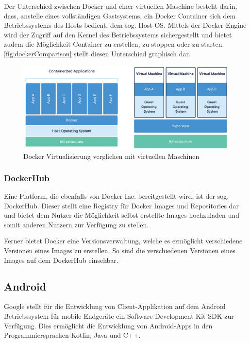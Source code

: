 			Der Unterschied zwischen Docker und einer virtuellen Maschine besteht darin, dass, anstelle eines vollständigen Gastsystems, ein Docker Container sich dem Betriebssystems des Hosts bedient, dem sog. Host OS. Mittels der Docker Engine wird der Zugriff auf den Kernel des Betriebssystems sichergestellt und bietet zudem die Möglichkeit Container zu erstellen, zu stoppen oder zu starten. \autoref{fig:dockerComparison} stellt diesen Unterschied graphisch dar. \cite{Turnbull.2014}
			
			\begin{figure}[ht!]
				\centering
				\includegraphics[width=1\textwidth]{images/docker-containerized-and-vm-transparent-bg.png}
				\caption{Docker Virtualisierung verglichen mit virtuellen Maschinen \cite{DockerInc..2020}}
				\label{fig:dockerComparison}
			\end{figure} 
			
			\subsubsection{DockerHub} %
				
				Eine Platform, die ebenfalls von Docker Inc. bereitgestellt wird, ist der sog. DockerHub. Dieser stellt eine Registry für Docker Images und Repositories dar und bietet dem Nutzer die Möglichkeit selbst erstellte Images hochzuladen und somit anderen Nutzern zur Verfügung zu stellen. 
				
				Ferner bietet Docker eine Versionsverwaltung, welche es ermöglicht verschiedene Versionen eines Images zu erstellen. So sind die verschiedenen Versionen eines Images auf dem DockerHub einsehbar.
		
		\subsection{Android} %
	
			Google stellt für die Entwicklung von Client-Applikation auf dem Android Betriebssystem für mobile Endgeräte ein Software Development Kit \ac{SDK} zur Verfügung. Dies ermöglicht die Entwicklung von Android-Apps in den Programmiersprachen Kotlin, Java und C++. 
			
